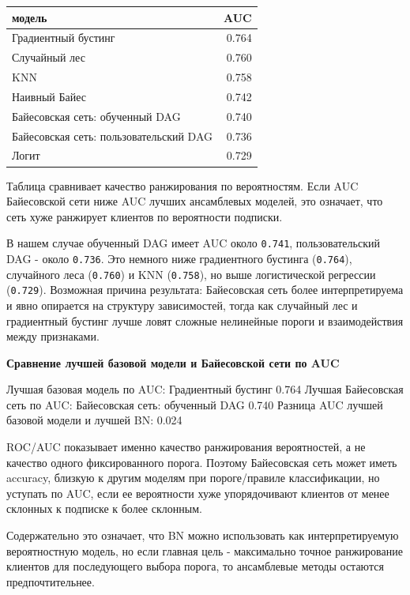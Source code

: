 \documentclass[11pt]{article}
\newcounter{none}
\begin{document}
{\def\LTcaptype{none} %
\begin{longtable}[]{@{}lr@{}}
\toprule\noalign{}
модель & AUC \\
\midrule\noalign{}
\endhead
\bottomrule\noalign{}
\endlastfoot
Градиентный бустинг & 0.764 \\
Случайный лес & 0.760 \\
KNN & 0.758 \\
Наивный Байес & 0.742 \\
Байесовская сеть: обученный DAG & 0.740 \\
Байесовская сеть: пользовательский DAG & 0.736 \\
Логит & 0.729 \\
\end{longtable}
}

    Таблица сравнивает качество ранжирования по вероятностям. Если AUC
Байесовской сети ниже AUC лучших ансамблевых моделей, это означает, что
сеть хуже ранжирует клиентов по вероятности подписки.

В нашем случае обученный DAG имеет AUC около \texttt{0.741},
пользовательский DAG - около \texttt{0.736}. Это немного ниже
градиентного бустинга (\texttt{0.764}), случайного леса (\texttt{0.760})
и KNN (\texttt{0.758}), но выше логистической регрессии
(\texttt{0.729}). Возможная причина результата: Байесовская сеть более
интерпретируема и явно опирается на структуру зависимостей, тогда как
случайный лес и градиентный бустинг лучше ловят сложные нелинейные
пороги и взаимодействия между признаками.

    \textbf{Сравнение лучшей базовой модели и Байесовской сети по AUC}

Лучшая базовая модель по AUC: Градиентный бустинг 0.764 Лучшая
Байесовская сеть по AUC: Байесовская сеть: обученный DAG 0.740 Разница
AUC лучшей базовой модели и лучшей BN: 0.024

    ROC/AUC показывает именно качество ранжирования вероятностей, а не
качество одного фиксированного порога. Поэтому Байесовская сеть может
иметь accuracy, близкую к другим моделям при пороге/правиле
классификации, но уступать по AUC, если ее вероятности хуже
упорядочивают клиентов от менее склонных к подписке к более склонным.

Содержательно это означает, что BN можно использовать как
интерпретируемую вероятностную модель, но если главная цель -
максимально точное ранжирование клиентов для последующего выбора порога,
то ансамблевые методы остаются предпочтительнее.
\end{document}
